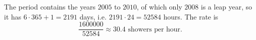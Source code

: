 The period contains the years $2005$ to $2010$, of which only $2008$ is a leap year, so it has $6\cdot365+1=2191$ days, i.e. $2191\cdot24=52584$ hours. The rate is
\[
\dfrac{1600000}{52584}\approx\boxed{30.4}\text{ showers per hour}.
\]
